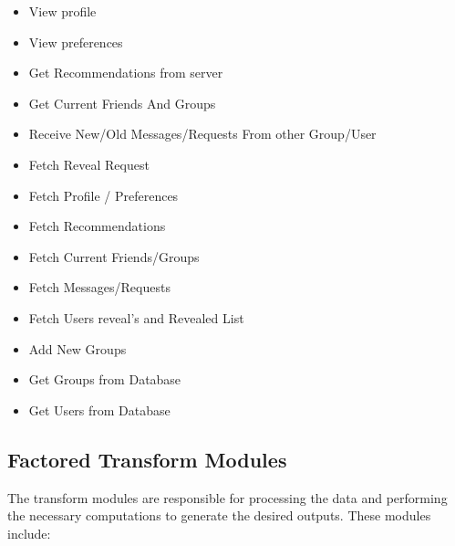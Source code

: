 \documentclass[12pt,a4paper]{article}
\begin{document}
\begin{itemize}
    \item View profile
    \item View preferences
    \item Get Recommendations from server
    \item Get Current Friends And Groups
    \item Receive New/Old Messages/Requests From other Group/User

    \item Fetch Reveal Request
    \item Fetch Profile / Preferences
    \item Fetch Recommendations
    \item Fetch Current Friends/Groups
    \item Fetch Messages/Requests
    \item Fetch Users reveal's and Revealed List
    \item Add New Groups

    \item Get Groups from Database
    \item Get Users from Database
\end{itemize}

\subsection{Factored Transform Modules}
The transform modules are responsible for processing the data and performing the necessary computations to generate the desired outputs. These modules include:
\end{document}
